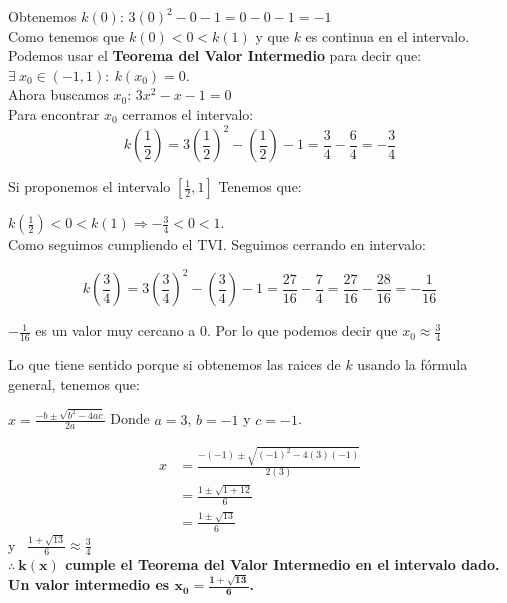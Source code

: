 \documentclass[12pt]{article}
\begin{document}
\begin{enumerate}[\hspace{9px} a)]
        Obtenemos $k(0)$: \quad \(3(0)^2-0-1=0-0-1=-1\)\\

        Como tenemos que \(k(0) < 0 < k(1)\) y que $k$ es continua en el intervalo. Podemos usar el \textbf{Teorema del Valor Intermedio} para decir que: \(\exists \ x_0 \in (-1,1) : \ k(x_0)=0\).\\

        Ahora buscamos $x_0$: \quad $3x^2-x-1=0$\\

        Para encontrar $x_0$ cerramos el intervalo:
        \[k\left(\displaystyle\frac{1}{2}\right) = 3\left(\frac{1}{2}\right)^2-\left(\frac{1}{2}\right)-1=\frac{3}{4}-\frac{6}{4}=-\frac{3}{4}\]

        Si proponemos el intervalo $\left[\displaystyle\frac{1}{2},1\right]$ Tenemos que:

        \(k\left(\displaystyle\frac{1}{2}\right) < 0 < k(1) \Longrightarrow -\displaystyle\frac{3}{4} <0<1\).\\

        Como seguimos cumpliendo el TVI. Seguimos cerrando en intervalo:

        \[k\left(\displaystyle\frac{3}{4}\right)=3\left(\frac{3}{4}\right)^2-\left(\frac{3}{4}\right)-1=\frac{27}{16}-\frac{7}{4}=\frac{27}{16}-\frac{28}{16}=-\frac{1}{16}\]

        $-\displaystyle\frac{1}{16}$ es un valor muy cercano a 0. Por lo que podemos decir que $x_0 \approx \displaystyle\frac{3}{4}$

        Lo que tiene sentido porque si obtenemos las raices de $k$ usando la f\'ormula general, tenemos que:

        \(x=\displaystyle\frac{-b\pm \sqrt{b^2-4ac}}{2a}\) \quad Donde $a=3$, $b=-1$ y $c=-1$.

        \begin{align*}
            x&=\frac{-(-1)\pm \sqrt{(-1)^2-4(3)(-1)}}{2(3)}\\
            &=\frac{1\pm \sqrt{1+12}}{6}\\
            &=\frac{1\pm \sqrt{13}}{6}
        \end{align*}
        y \ \(\displaystyle\frac{1+\sqrt{13}}{6} \approx \frac{3}{4}\)\\

        \textbf{$\mathbf{\therefore \ k(x)}$ cumple el Teorema del Valor Intermedio en el intervalo dado. Un valor intermedio es $\mathbf{x_0=\displaystyle\frac{1+\sqrt{13}}{6}}$.}\\

\end{enumerate}
\end{document}
